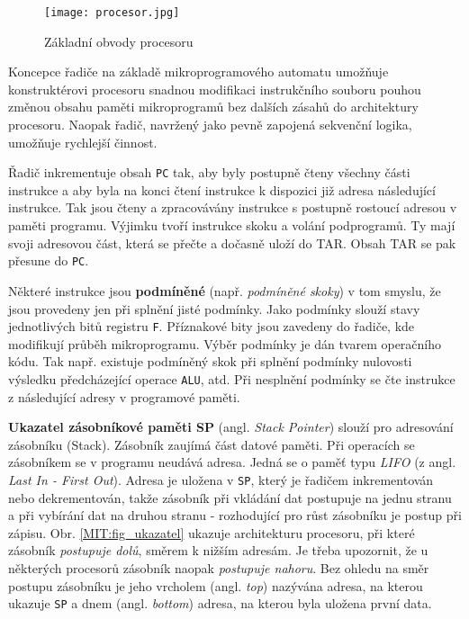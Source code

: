     \begin{figure}[ht!] %
      \centering
      \texttt{[image: procesor.jpg]}
      \caption{Základní obvody procesoru}
      \label{MIT:fig_procesor}
    \end{figure}
    
    \begin{note}      
      Koncepce řadiče na základě mikroprogramového automatu umožňuje konstruktérovi procesoru 
      snadnou modifikaci instrukčního souboru pouhou změnou obsahu paměti mikroprogramů bez dalších 
      zásahů do architektury procesoru. Naopak řadič, navržený jako pevně zapojená sekvenční 
      logika, umožňuje rychlejší činnost.
    \end{note}
    
    Řadič inkrementuje obsah \texttt{PC} tak, aby byly postupně čteny všechny části instrukce a aby 
    byla na konci čtení instrukce k dispozici již adresa následující instrukce. Tak jsou čteny a 
    zpracovávány instrukce s postupně rostoucí adresou v paměti programu. Výjimku tvoří instrukce 
    skoku a volání podprogramů. Ty mají svoji adresovou část, která se přečte a dočasně uloží do 
    TAR. Obsah TAR se pak přesune do \texttt{PC}.
    
    Některé instrukce jsou \textbf{podmíněné} (např. \emph{podmíněné skoky}) v tom smyslu, že jsou 
    provedeny jen při splnění jisté podmínky. Jako podmínky slouží stavy jednotlivých bitů registru 
    \texttt{F}. Příznakové bity jsou zavedeny do řadiče, kde modifikují průběh mikroprogramu. Výběr 
    podmínky je dán tvarem operačního kódu. Tak např. existuje podmíněný skok při splnění 
    podmínky nulovosti výsledku předcházející operace \texttt{ALU}, atd. Při nesplnění podmínky se 
    čte instrukce z následující adresy v programové paměti.
     
    \textbf{Ukazatel zásobníkové paměti SP} (angl. \emph{Stack Pointer}) slouží pro adresování 
    zásobníku (Stack). Zásobník zaujímá část datové paměti. Při operacích se zásobníkem se v 
    programu neudává adresa. Jedná se o paměť typu \emph{LIFO} (z angl. \emph{Last In - First 
    Out}). Adresa je uložena v \texttt{SP}, který je řadičem inkrementován nebo dekrementován, 
    takže zásobník při vkládání dat postupuje na jednu stranu a při vybírání dat na druhou stranu - 
    rozhodující pro růst zásobníku je postup při zápisu. Obr. \ref{MIT:fig_ukazatel} ukazuje 
    architekturu procesoru, při které zásobník \emph{postupuje dolů}, směrem k nižším adresám. Je 
    třeba upozornit, že u některých procesorů zásobník naopak \emph{postupuje nahoru}. Bez 
    ohledu na směr postupu zásobníku je jeho vrcholem (angl. \emph{top}) nazývána adresa, na kterou 
    ukazuje \texttt{SP} a dnem (angl. \emph{bottom}) adresa, na kterou byla uložena první data.
    
